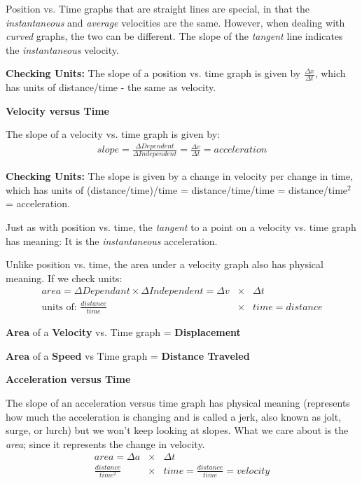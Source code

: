 \documentclass[12pt]{article}
\begin{document}
Position vs. Time graphs that are straight lines are special, in that the \textit{instantaneous} and \textit{average} velocities are the same. However, when dealing with \textit{curved} graphs, the two can be different. The slope of the \textit{tangent} line indicates the \textit{instantaneous} velocity.

\begin{center}\end{center}


\textbf{Checking Units:} The slope of a position vs. time graph is given by $\frac{\Delta x}{\Delta t}$, which has units of distance/time - the same as velocity.
\vspace{0.2in}

\noindent\textbf{\large Velocity versus Time}

The slope of a velocity vs. time graph is given by:
\begin{eqnarray}
slope = \frac{\Delta Dependent}{\Delta Independent} = \frac{\Delta v}{\Delta t} = acceleration \nonumber
\end{eqnarray}

\textbf{Checking Units:} The slope is given by a change in velocity per change in time, which has units of (distance/time)/time = distance/time/time = distance/time$^2$ = acceleration.

Just as with position vs. time, the \textit{tangent} to a point on a velocity vs. time graph has meaning: It is the \textit{instantaneous} acceleration.

Unlike position vs. time, the area under a velocity graph also has physical meaning. If we check units:
\begin{eqnarray}
area = \Delta Dependant \times \Delta Independent = \Delta v &\times & \Delta t \nonumber \\
\textrm{units of: } \frac{distance}{time} &\times & time = distance
\end{eqnarray}

\textbf{Area} of a \textbf{Velocity} vs. Time graph = \textbf{Displacement}

\textbf{Area} of a \textbf{Speed} vs Time graph = \textbf{Distance Traveled}
\vspace{0.2in}

\noindent\textbf{\large Acceleration versus Time}

The slope of an acceleration versus time graph has physical meaning (represents how much the acceleration is changing and is called a jerk, also known as jolt, surge, or lurch) but we won't keep looking at slopes. What we care about is the \textit{area}; since it represents the change in velocity.
\begin{eqnarray}
area = \Delta a &\times & \Delta t \nonumber \\
\frac{distance}{time^2} &\times & time = \frac{distance}{time} = velocity
\end{eqnarray}
\end{document}
